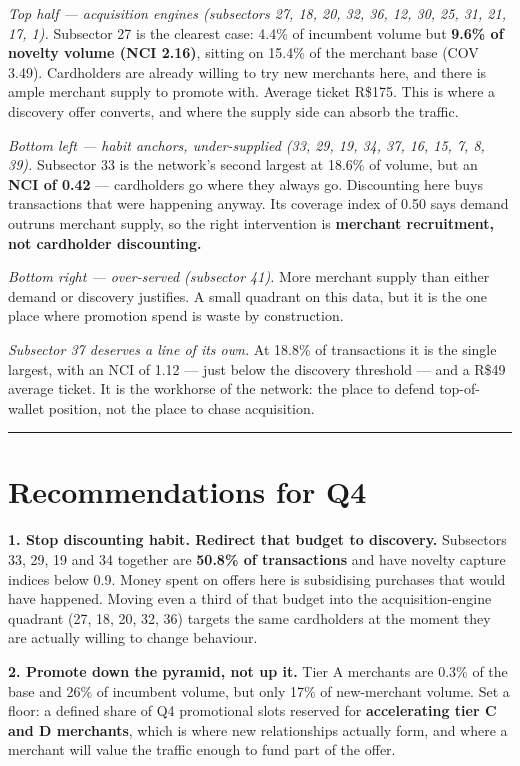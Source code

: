 \documentclass[
]{article}
\begin{document}
\emph{Top half --- acquisition engines (subsectors 27, 18, 20, 32, 36,
12, 30, 25, 31, 21, 17, 1).} Subsector 27 is the clearest case: 4.4\% of
incumbent volume but \textbf{9.6\% of novelty volume (NCI 2.16)},
sitting on 15.4\% of the merchant base (COV 3.49). Cardholders are
already willing to try new merchants here, and there is ample merchant
supply to promote with. Average ticket R\$175. This is where a discovery
offer converts, and where the supply side can absorb the traffic.

\emph{Bottom left --- habit anchors, under-supplied (33, 29, 19, 34, 37,
16, 15, 7, 8, 39).} Subsector 33 is the network's second largest at
18.6\% of volume, but an \textbf{NCI of 0.42} --- cardholders go where
they always go. Discounting here buys transactions that were happening
anyway. Its coverage index of 0.50 says demand outruns merchant supply,
so the right intervention is \textbf{merchant recruitment, not
cardholder discounting.}

\emph{Bottom right --- over-served (subsector 41).} More merchant supply
than either demand or discovery justifies. A small quadrant on this
data, but it is the one place where promotion spend is waste by
construction.

\emph{Subsector 37 deserves a line of its own.} At 18.8\% of
transactions it is the single largest, with an NCI of 1.12 --- just
below the discovery threshold --- and a R\$49 average ticket. It is the
workhorse of the network: the place to defend top-of-wallet position,
not the place to chase acquisition.

\begin{center}\rule{0.5\linewidth}{0.5pt}\end{center}

\section{Recommendations for Q4}\label{recommendations-for-q4}

\textbf{1. Stop discounting habit. Redirect that budget to discovery.}
Subsectors 33, 29, 19 and 34 together are \textbf{50.8\% of
transactions} and have novelty capture indices below 0.9. Money spent on
offers here is subsidising purchases that would have happened. Moving
even a third of that budget into the acquisition-engine quadrant (27,
18, 20, 32, 36) targets the same cardholders at the moment they are
actually willing to change behaviour.

\textbf{2. Promote down the pyramid, not up it.} Tier A merchants are
0.3\% of the base and 26\% of incumbent volume, but only 17\% of
new-merchant volume. Set a floor: a defined share of Q4 promotional
slots reserved for \textbf{accelerating tier C and D merchants}, which
is where new relationships actually form, and where a merchant will
value the traffic enough to fund part of the offer.
\end{document}

